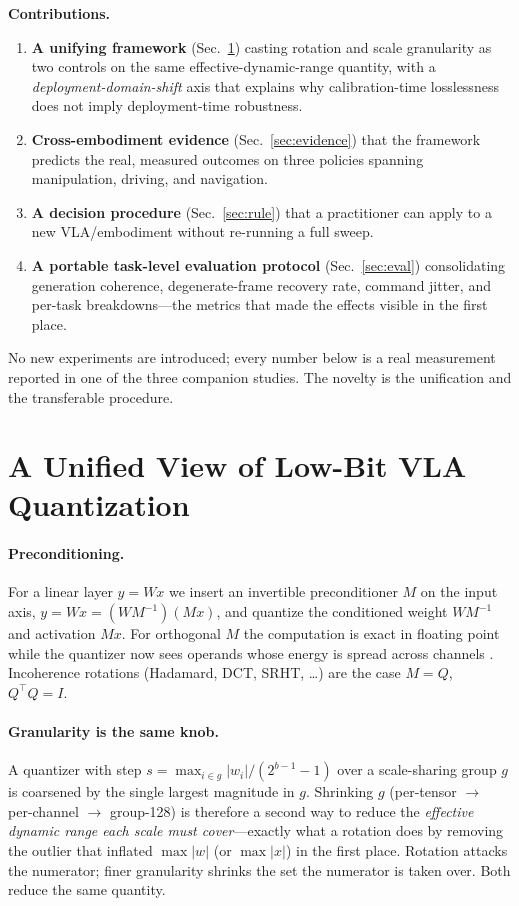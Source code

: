 \documentclass[11pt]{article}
\begin{document}
\noindent\textbf{Contributions.}
\begin{enumerate}
  \item \textbf{A unifying framework} (Sec.~\ref{sec:framework}) casting rotation and scale
        granularity as two controls on the same effective-dynamic-range quantity, with a
        \emph{deployment-domain-shift} axis that explains why calibration-time losslessness does not
        imply deployment-time robustness.
  \item \textbf{Cross-embodiment evidence} (Sec.~\ref{sec:evidence}) that the framework predicts the
        real, measured outcomes on three policies spanning manipulation, driving, and navigation.
  \item \textbf{A decision procedure} (Sec.~\ref{sec:rule}) that a practitioner can apply to a new
        VLA/embodiment without re-running a full sweep.
  \item \textbf{A portable task-level evaluation protocol} (Sec.~\ref{sec:eval}) consolidating
        generation coherence, degenerate-frame recovery rate, command jitter, and per-task
        breakdowns---the metrics that made the effects visible in the first place.
\end{enumerate}
No new experiments are introduced; every number below is a real measurement reported in one of the
three companion studies. The novelty is the unification and the transferable procedure.

\section{A Unified View of Low-Bit VLA Quantization}\label{sec:framework}
\paragraph{Preconditioning.} For a linear layer $y=Wx$ we insert an invertible preconditioner $M$ on
the input axis, $y=Wx=(WM^{-1})(Mx)$, and quantize the conditioned weight $WM^{-1}$ and activation
$Mx$. For orthogonal $M$ the computation is exact in floating point while the quantizer now sees
operands whose energy is spread across channels \cite{quarot,spinquant,quip}. Incoherence rotations
(Hadamard, DCT, SRHT, \dots) are the case $M=Q$, $Q^\top Q=I$.

\paragraph{Granularity is the same knob.} A quantizer with step $s=\max_{i\in g}|w_i|/(2^{b-1}{-}1)$
over a scale-sharing group $g$ is coarsened by the single largest magnitude in $g$. Shrinking $g$
(per-tensor $\to$ per-channel $\to$ group-128) is therefore a second way to reduce the
\emph{effective dynamic range each scale must cover}---exactly what a rotation does by removing the
outlier that inflated $\max|w|$ (or $\max|x|$) in the first place. Rotation attacks the numerator;
finer granularity shrinks the set the numerator is taken over. Both reduce the same quantity.
\end{document}
